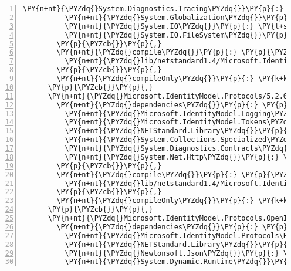 \begin{Verbatim}[commandchars=\\\{\},numbers=left,firstnumber=1,stepnumber=1,numberblanklines=0]
          \PY{n+nt}{\PYZdq{}System.Diagnostics.Tracing\PYZdq{}}\PY{p}{:} \PY{l+s+s2}{\PYZdq{}4.3.0\PYZdq{}}\PY{p}{,}
          \PY{n+nt}{\PYZdq{}System.Globalization\PYZdq{}}\PY{p}{:} \PY{l+s+s2}{\PYZdq{}4.3.0\PYZdq{}}\PY{p}{,}
          \PY{n+nt}{\PYZdq{}System.IO\PYZdq{}}\PY{p}{:} \PY{l+s+s2}{\PYZdq{}4.3.0\PYZdq{}}\PY{p}{,}
          \PY{n+nt}{\PYZdq{}System.IO.FileSystem\PYZdq{}}\PY{p}{:} \PY{l+s+s2}{\PYZdq{}4.3.0\PYZdq{}}
        \PY{p}{\PYZcb{}}\PY{p}{,}
        \PY{n+nt}{\PYZdq{}compile\PYZdq{}}\PY{p}{:} \PY{p}{\PYZob{}}
          \PY{n+nt}{\PYZdq{}lib/netstandard1.4/Microsoft.IdentityModel.Logging.dll\PYZdq{}}\PY{p}{:} \PY{p}{\PYZob{}}\PY{p}{\PYZcb{}}
        \PY{p}{\PYZcb{}}\PY{p}{,}
        \PY{n+nt}{\PYZdq{}compileOnly\PYZdq{}}\PY{p}{:} \PY{k+kc}{true}
      \PY{p}{\PYZcb{}}\PY{p}{,}
      \PY{n+nt}{\PYZdq{}Microsoft.IdentityModel.Protocols/5.2.0\PYZdq{}}\PY{p}{:} \PY{p}{\PYZob{}}
        \PY{n+nt}{\PYZdq{}dependencies\PYZdq{}}\PY{p}{:} \PY{p}{\PYZob{}}
          \PY{n+nt}{\PYZdq{}Microsoft.IdentityModel.Logging\PYZdq{}}\PY{p}{:} \PY{l+s+s2}{\PYZdq{}5.2.0\PYZdq{}}\PY{p}{,}
          \PY{n+nt}{\PYZdq{}Microsoft.IdentityModel.Tokens\PYZdq{}}\PY{p}{:} \PY{l+s+s2}{\PYZdq{}5.2.0\PYZdq{}}\PY{p}{,}
          \PY{n+nt}{\PYZdq{}NETStandard.Library\PYZdq{}}\PY{p}{:} \PY{l+s+s2}{\PYZdq{}2.0.3\PYZdq{}}\PY{p}{,}
          \PY{n+nt}{\PYZdq{}System.Collections.Specialized\PYZdq{}}\PY{p}{:} \PY{l+s+s2}{\PYZdq{}4.3.0\PYZdq{}}\PY{p}{,}
          \PY{n+nt}{\PYZdq{}System.Diagnostics.Contracts\PYZdq{}}\PY{p}{:} \PY{l+s+s2}{\PYZdq{}4.3.0\PYZdq{}}\PY{p}{,}
          \PY{n+nt}{\PYZdq{}System.Net.Http\PYZdq{}}\PY{p}{:} \PY{l+s+s2}{\PYZdq{}4.3.0\PYZdq{}}
        \PY{p}{\PYZcb{}}\PY{p}{,}
        \PY{n+nt}{\PYZdq{}compile\PYZdq{}}\PY{p}{:} \PY{p}{\PYZob{}}
          \PY{n+nt}{\PYZdq{}lib/netstandard1.4/Microsoft.IdentityModel.Protocols.dll\PYZdq{}}\PY{p}{:} \PY{p}{\PYZob{}}\PY{p}{\PYZcb{}}
        \PY{p}{\PYZcb{}}\PY{p}{,}
        \PY{n+nt}{\PYZdq{}compileOnly\PYZdq{}}\PY{p}{:} \PY{k+kc}{true}
      \PY{p}{\PYZcb{}}\PY{p}{,}
      \PY{n+nt}{\PYZdq{}Microsoft.IdentityModel.Protocols.OpenIdConnect/5.2.0\PYZdq{}}\PY{p}{:} \PY{p}{\PYZob{}}
        \PY{n+nt}{\PYZdq{}dependencies\PYZdq{}}\PY{p}{:} \PY{p}{\PYZob{}}
          \PY{n+nt}{\PYZdq{}Microsoft.IdentityModel.Protocols\PYZdq{}}\PY{p}{:} \PY{l+s+s2}{\PYZdq{}5.2.0\PYZdq{}}\PY{p}{,}
          \PY{n+nt}{\PYZdq{}NETStandard.Library\PYZdq{}}\PY{p}{:} \PY{l+s+s2}{\PYZdq{}2.0.3\PYZdq{}}\PY{p}{,}
          \PY{n+nt}{\PYZdq{}Newtonsoft.Json\PYZdq{}}\PY{p}{:} \PY{l+s+s2}{\PYZdq{}11.0.2\PYZdq{}}\PY{p}{,}
          \PY{n+nt}{\PYZdq{}System.Dynamic.Runtime\PYZdq{}}\PY{p}{:} \PY{l+s+s2}{\PYZdq{}4.3.0\PYZdq{}}\PY{p}{,}

\end{Verbatim}
